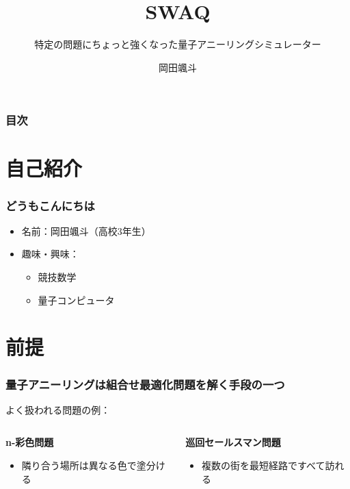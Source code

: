 \title[Swaq]{\color{black} \LARGE SWAQ}
\subtitle[ちょっと強いQAS]{特定の問題にちょっと強くなった量子アニーリングシミュレーター}
\author[岡田颯斗]{岡田颯斗}
\date{}
\begin{frame}{}
\titlepage
\end{frame}
\large

\begin{frame}
  \frametitle{目次}
  \tableofcontents
\end{frame}


\section{自己紹介}
\begin{frame}
  \frametitle{どうもこんにちは}
  \begin{itemize}
      \item 名前：岡田颯斗（高校3年生）
      \item 趣味・興味：
      \begin{itemize}
          \item 競技数学
          \item 量子コンピュータ
      \end{itemize}
  \end{itemize}
\end{frame}

\section{前提}
\begin{frame}
  \frametitle{量子アニーリングは組合せ最適化問題を解く手段の一つ}
  よく扱われる問題の例：\\
  \vspace{10mm}
  \begin{columns}
    \begin{column}{0.45\textwidth}
      \textbf{n-彩色問題}
      \begin{itemize}
          \item 隣り合う場所は異なる色で塗分ける
      \end{itemize}
    \end{column}

    \begin{column}{0.45\textwidth}
      \textbf{巡回セールスマン問題}
      \begin{itemize}
          \item 複数の街を最短経路ですべて訪れる
      \end{itemize}
    \end{column}
  \end{columns}
  \vspace{5mm}
\end{frame}

